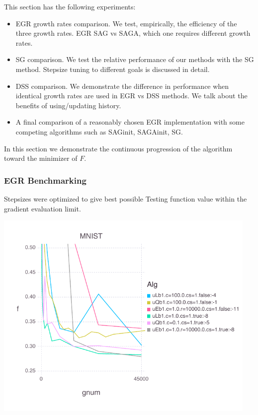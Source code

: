 \documentclass[11pt]{article}
\begin{document}
   This section has the following experiments: 
   \begin{itemize}
    \item EGR growth rates comparison. We test, empirically, the efficiency of the three growth rates. EGR SAG vs SAGA, which one requires different growth rates. 
    \item SG comparison. We test the relative performance of our methods with the SG method. Stepsize tuning to different goals is discussed in detail. 
   	\item DSS comparison. We demonstrate the difference in performance when identical growth rates are used in EGR vs DSS methods. We talk about the benefits of using/updating history. 
   	\item A final comparison of a reasonably chosen EGR implementation with some competing algorithms such as SAGinit, SAGAinit, SG.
   \end{itemize}

   In this section we demonstrate the continuous progression of the algorithm toward the minimizer of $F$.
   
   \newpage 
   
   \subsubsection{EGR Benchmarking}
   
   Stepsizes were optimized to give best possible Testing function value within the gradient evaluation limit.
   
   \includegraphics[width= 5in]{Figures/MNISTBLtruefInitialHeuristics.pdf}
   
\end{document}
